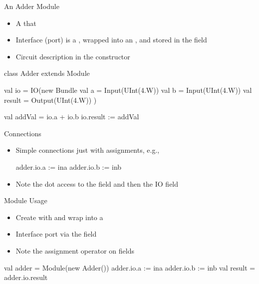 \begin{frame}[fragile]{An Adder Module}
\begin{itemize}
\item A  that  
\item Interface (port) is a , wrapped into an , and stored in the field 
\item Circuit description in the constructor
\end{itemize}
\begin{chisel}
class Adder extends Module {
  val io = IO(new Bundle {
    val a = Input(UInt(4.W))
    val b = Input(UInt(4.W))
    val result = Output(UInt(4.W))
  })

  val addVal = io.a + io.b
  io.result := addVal
}
\end{chisel}
\end{frame}

\begin{frame}[fragile]{Connections}
\begin{itemize}
\item Simple connections just with assignments, e.g.,
\begin{chisel}
  adder.io.a := ina
  adder.io.b := inb
\end{chisel}
\item Note the dot access to the field  and then the IO field
\end{itemize}
\end{frame}



\begin{frame}[fragile]{Module Usage}
\begin{itemize}
\item Create with  and wrap into a 
\item Interface port via the  field
\item Note the assignment operator \code{:=} on  fields
\end{itemize}
\begin{chisel}
  val adder = Module(new Adder())
  adder.io.a := ina
  adder.io.b := inb
  val result = adder.io.result
\end{chisel}
\end{frame}

